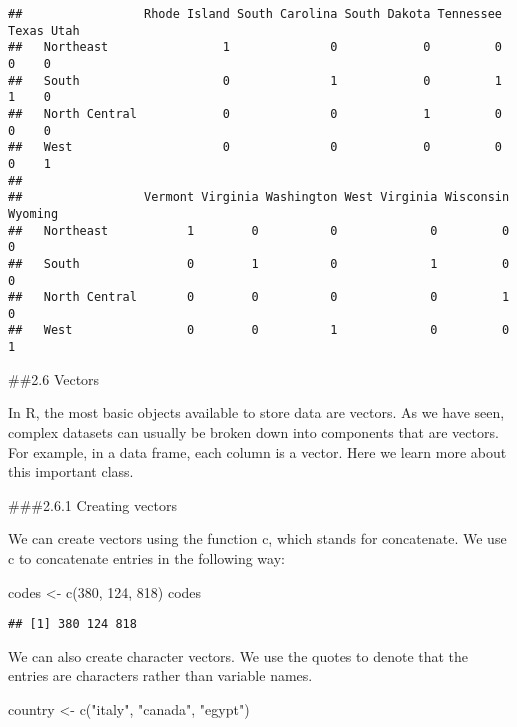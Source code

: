 \documentclass[
]{article}
\newenvironment{Shaded}{\begin{snugshade}}{\end{snugshade}}
\newcommand{\DecValTok}[1]{\textcolor[rgb]{0.00,0.00,0.81}{#1}}
\newcommand{\FunctionTok}[1]{\textcolor[rgb]{0.00,0.00,0.00}{#1}}
\newcommand{\NormalTok}[1]{#1}
\newcommand{\OtherTok}[1]{\textcolor[rgb]{0.56,0.35,0.01}{#1}}
\newcommand{\StringTok}[1]{\textcolor[rgb]{0.31,0.60,0.02}{#1}}
\begin{document}
\begin{verbatim}
##                 Rhode Island South Carolina South Dakota Tennessee Texas Utah
##   Northeast                1              0            0         0     0    0
##   South                    0              1            0         1     1    0
##   North Central            0              0            1         0     0    0
##   West                     0              0            0         0     0    1
##                
##                 Vermont Virginia Washington West Virginia Wisconsin Wyoming
##   Northeast           1        0          0             0         0       0
##   South               0        1          0             1         0       0
##   North Central       0        0          0             0         1       0
##   West                0        0          1             0         0       1
\end{verbatim}

\#\#2.6 Vectors

In R, the most basic objects available to store data are vectors. As we
have seen, complex datasets can usually be broken down into components
that are vectors. For example, in a data frame, each column is a vector.
Here we learn more about this important class.

\#\#\#2.6.1 Creating vectors

We can create vectors using the function c, which stands for
concatenate. We use c to concatenate entries in the following way:

\begin{Shaded}
\begin{Highlighting}[]
\NormalTok{codes }\OtherTok{\textless{}{-}} \FunctionTok{c}\NormalTok{(}\DecValTok{380}\NormalTok{, }\DecValTok{124}\NormalTok{, }\DecValTok{818}\NormalTok{)}
\NormalTok{codes}
\end{Highlighting}
\end{Shaded}

\begin{verbatim}
## [1] 380 124 818
\end{verbatim}

We can also create character vectors. We use the quotes to denote that
the entries are characters rather than variable names.

\begin{Shaded}
\begin{Highlighting}[]
\NormalTok{country }\OtherTok{\textless{}{-}} \FunctionTok{c}\NormalTok{(}\StringTok{"italy"}\NormalTok{, }\StringTok{"canada"}\NormalTok{, }\StringTok{"egypt"}\NormalTok{)}
\end{Highlighting}
\end{Shaded}
\end{document}
